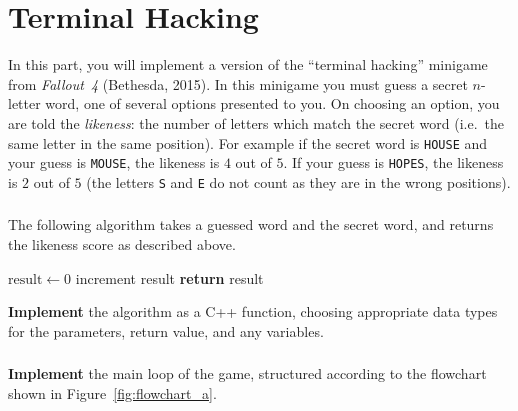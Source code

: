 \part{Terminal Hacking}

In this part, you will implement a version of the ``terminal hacking'' minigame from \emph{Fallout~4} (Bethesda, 2015).
In this minigame you must guess a secret $n$-letter word, one of several options presented to you.
On choosing an option, you are told the \emph{likeness}: the number of letters which match the secret word (i.e.\ the same letter in the same position).
For example if the secret word is \texttt{HOUSE} and your guess is \texttt{MOUSE}, the likeness is $4$ out of $5$.
If your guess is \texttt{HOPES}, the likeness is $2$ out of $5$ (the letters \texttt{S} and \texttt{E} do not count as they are in the wrong positions).

\section{} \label{core-a-first}

The following algorithm takes a guessed word and the secret word, and returns the likeness score as described above.

\begin{algorithm}
\begin{algorithmic}
        \State $\text{result} \gets 0$
                \State increment result
            \EndIf
        \EndFor
        \State \textbf{return} result
    \EndProcedure
\end{algorithmic}
\end{algorithm}

\textbf{Implement} the algorithm as a C++ function, choosing appropriate data types for the parameters, return value, and any variables.

\section{} \label{core-a-last}

\textbf{Implement} the main loop of the game, structured
according to the flowchart shown in Figure~\ref{fig:flowchart_a}.

